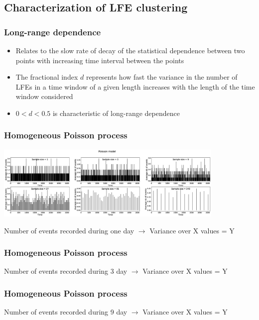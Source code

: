 \documentclass{beamer}
\begin{document}

	\subsection{Characterization of LFE clustering}

	\begin{frame}
		\frametitle{Long-range dependence}
		\begin{itemize}
			\item Relates to the slow rate of decay of the statistical dependence between two points with increasing time interval between the points
			\item The fractional index $d$ represents how fast the variance in the number of LFEs in a time window of a given length increases with the length of the time window considered
			\item $0 < d < 0.5$ is characteristic of long-range dependence
		\end{itemize}
	\end{frame}

	\begin{frame}
		\frametitle{Homogeneous Poisson process}
		\begin{center}
			\includegraphics[width=11cm, trim={0cm 0cm 0cm 0cm}, clip]{other/Poisson.eps}
		\end{center}
		Number of events recorded during one day $\rightarrow$ Variance over X values = Y
	\end{frame}

	\begin{frame}
		\frametitle{Homogeneous Poisson process}
		Number of events recorded during 3 day $\rightarrow$ Variance over X values = Y
	\end{frame}

	\begin{frame}
		\frametitle{Homogeneous Poisson process}
		Number of events recorded during 9 day $\rightarrow$ Variance over X values = Y
	\end{frame}
\end{document}
